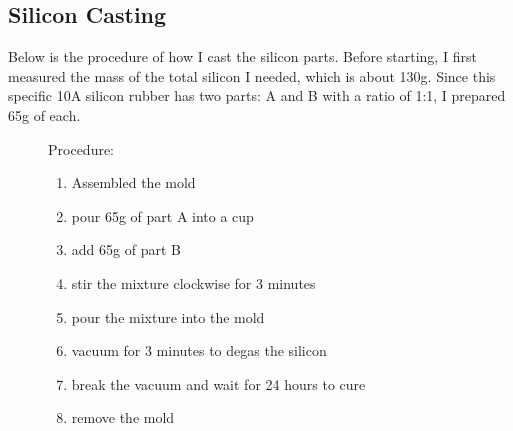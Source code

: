 \documentclass[twoside]{article}
\begin{document}
\subsection{Silicon Casting}
Below is the procedure of how I cast the silicon parts. Before starting, I first measured the mass of the total silicon I needed, which is about 130g. Since this specific 10A silicon rubber has two parts: A and B with a ratio of 1:1, I prepared 65g of each. 
\begin{figure} [H]
	\setlength\itemsep{-8pt}
	Procedure:
	\begin{enumerate}
 		\item Assembled the mold
 		\item pour 65g of part A into a cup
 		\item add 65g of part B
 		\item stir the mixture clockwise for 3 minutes
 		\item pour the mixture into the mold
 		\item vacuum for 3 minutes to degas the silicon
 		\item break the vacuum and wait for 24 hours to cure
 		\item remove the mold
	\end{enumerate}
\end{figure}
\end{document}
